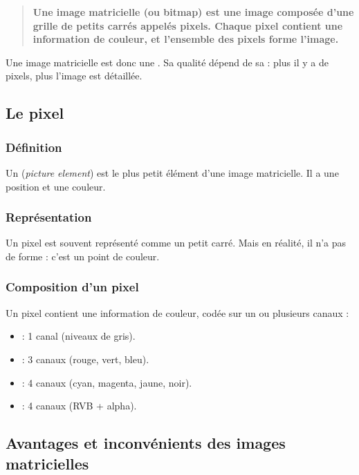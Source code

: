 \begin{quote}
\textbf{Une image matricielle (ou bitmap) est une image composée d'une grille de petits carrés appelés pixels. Chaque pixel contient une information de couleur, et l'ensemble des pixels forme l'image.}
\end{quote}

Une image matricielle est donc une . Sa qualité dépend de sa  : plus il y a de pixels, plus l'image est détaillée.

\subsection{Le pixel}

\subsubsection{Définition}

Un  (\emph{picture element}) est le plus petit élément d'une image matricielle. Il a une position et une couleur.

\subsubsection{Représentation}

Un pixel est souvent représenté comme un petit carré. Mais en réalité, il n'a pas de forme : c'est un point de couleur.

\subsubsection{Composition d'un pixel}

Un pixel contient une information de couleur, codée sur un ou plusieurs canaux :

\begin{itemize}
    \item {} : 1 canal (niveaux de gris).
    \item {} : 3 canaux (rouge, vert, bleu).
    \item {} : 4 canaux (cyan, magenta, jaune, noir).
    \item {} : 4 canaux (RVB + alpha).
\end{itemize}

\subsection{Avantages et inconvénients des images matricielles}

